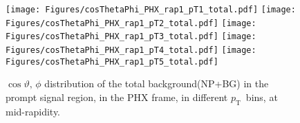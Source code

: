 \documentclass[12pt]{article}
\newcommand{\pt}{$p_{\mathrm{T}}$}
\begin{document}
%
%


\begin{figure}[htbp]
\centering
\texttt{[image: Figures/cosThetaPhi\_PHX\_rap1\_pT1\_total.pdf]}
\texttt{[image: Figures/cosThetaPhi\_PHX\_rap1\_pT2\_total.pdf]}
\texttt{[image: Figures/cosThetaPhi\_PHX\_rap1\_pT3\_total.pdf]}
\texttt{[image: Figures/cosThetaPhi\_PHX\_rap1\_pT4\_total.pdf]}
\texttt{[image: Figures/cosThetaPhi\_PHX\_rap1\_pT5\_total.pdf]}
\caption{$\cos\vartheta,\,\phi$ distribution of the total background(NP+BG) in the prompt signal region, 
	in the PHX frame, in different \pt\ bins, at mid-rapidity.}
\end{figure}
\clearpage
\end{document}
